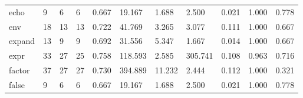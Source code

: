 \begin{longtable}{lp{1.2cm}p{1.2cm}p{1.2cm}p{1.2cm}p{1.2cm}p{1.2cm}p{1.2cm}p{1.2cm}p{1.2cm}p{1.2cm}}
echo      &                            9 &                  6 &                                 6 &                                      0.667 &                                 19.167 &                                        1.688 &                             2.500 &                                   0.021 &                              1.000 &                                              0.778 \\
env       &                           18 &                 13 &                                13 &                                      0.722 &                                 41.769 &                                        3.265 &                             3.077 &                                   0.111 &                              1.000 &                                              0.667 \\
expand    &                           13 &                  9 &                                 9 &                                      0.692 &                                 31.556 &                                        5.347 &                             1.667 &                                   0.014 &                              1.000 &                                              0.667 \\
expr      &                           33 &                 27 &                                25 &                                      0.758 &                                118.593 &                                        2.585 &                           305.741 &                                   0.108 &                              0.963 &                                              0.716 \\
factor    &                           37 &                 27 &                                27 &                                      0.730 &                                394.889 &                                       11.232 &                             2.444 &                                   0.112 &                              1.000 &                                              0.321 \\
false     &                            9 &                  6 &                                 6 &                                      0.667 &                                 19.167 &                                        1.688 &                             2.500 &                                   0.021 &                              1.000 &                                              0.778 \\

\end{longtable}
